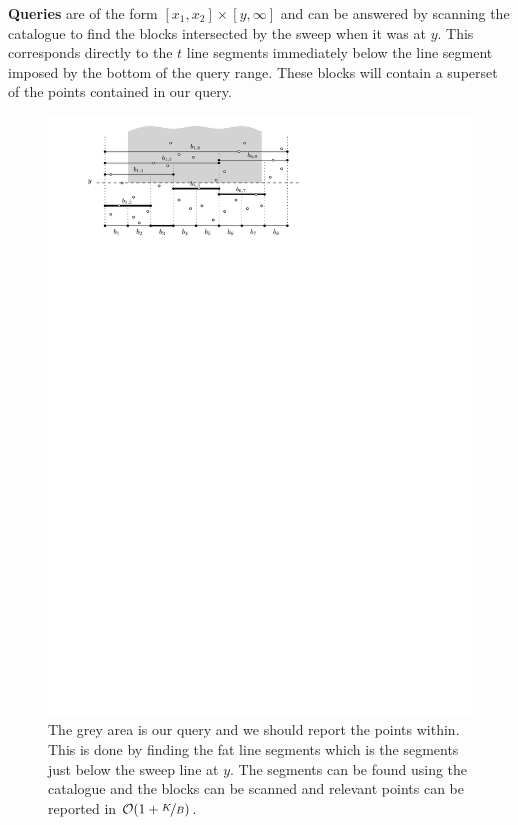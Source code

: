 \documentclass[twoside,11pt,openright]{report}
\begin{document}
\textbf{Queries} are of the form $[x_1,x_2] \times [y,\infty]$ and can be answered by scanning the catalogue to find the blocks intersected by the sweep when it was at $y$. This corresponds directly to the $t$ line segments immediately below the line segment imposed by the bottom of the query range. These blocks will contain a superset of the points contained in our query.

\begin{figure}[h]
	\centering
	\includegraphics[scale=1]{../figures/sweep-line-with-query}
	\caption{The grey area is our query and we should report the points within. This is done by finding the fat line segments which is the segments just below the sweep line at $y$. The segments can be found using the catalogue and the blocks can be scanned and relevant points can be reported in $\mathcal{O}(1+\nicefrac{K}{B})$.}
	\label{fig:sweep-line-query}
\end{figure}
\end{document}
